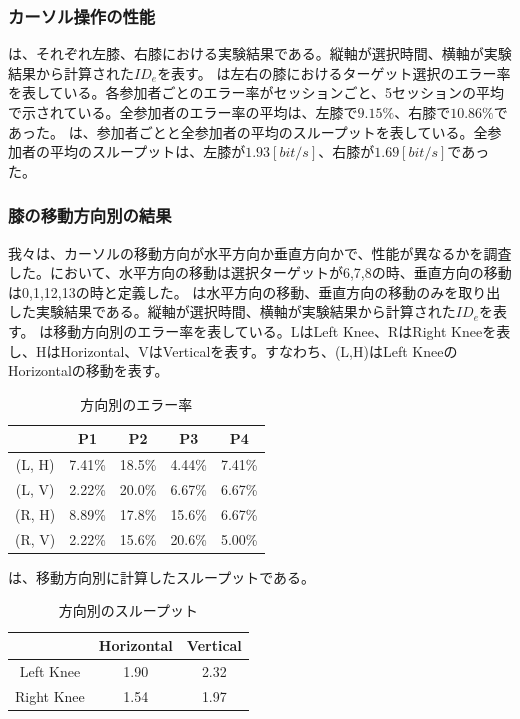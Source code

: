 \documentclass[submit, techrep]{ipsj}
\begin{document}
\subsubsection{カーソル操作の性能}
は、それぞれ左膝、右膝における実験結果である。縦軸が選択時間、横軸が実験結果から計算された$ID_e$を表す。
は左右の膝におけるターゲット選択のエラー率を表している。各参加者ごとのエラー率がセッションごと、5セッションの平均で示されている。全参加者のエラー率の平均は、左膝で$9.15\%$、右膝で$10.86\%$であった。
は、参加者ごとと全参加者の平均のスループットを表している。全参加者の平均のスループットは、左膝が$1.93[bit/s]$、右膝が$1.69[bit/s]$であった。
\subsubsection{膝の移動方向別の結果}
我々は、カーソルの移動方向が水平方向か垂直方向かで、性能が異なるかを調査した。において、水平方向の移動は選択ターゲットが6,7,8の時、垂直方向の移動は0,1,12,13の時と定義した。
は水平方向の移動、垂直方向の移動のみを取り出した実験結果である。縦軸が選択時間、横軸が実験結果から計算された$ID_e$を表す。
は移動方向別のエラー率を表している。LはLeft Knee、RはRight Kneeを表し、HはHorizontal、VはVerticalを表す。すなわち、(L,H)はLeft KneeのHorizontalの移動を表す。
\begin{table}[tb]
	\begin{center}
		\begin{tabular}{|c|c|c|c|c|}
		\hline
				& P1 & P2 & P3 & P4 \\ \hline
		(L, H) & 7.41\% & 18.5\% & 4.44\% & 7.41\% \\ \hline
		(L, V) & 2.22\% & 20.0\% & 6.67\% & 6.67\% \\ \hline
		(R, H) & 8.89\% & 17.8\% & 15.6\% & 6.67\% \\ \hline
		(R, V) & 2.22\% & 15.6\% & 20.6\% & 5.00\% \\ \hline
		\end{tabular}
	\end{center}
	\caption{方向別のエラー率}
	\label{tb:err_direction}
\end{table}
は、移動方向別に計算したスループットである。
\begin{table}[tb]
	\begin{center}
		\begin{tabular}{|c|c|c|}
		\hline
				   & Horizontal & Vertical   \\ \hline
		Left Knee  & 1.90 & 2.32  \\ \hline
		Right Knee & 1.54 & 1.97  \\ \hline
		\end{tabular}
	\end{center}
	\caption{方向別のスループット}
	\label{tb:tp_direction}
\end{table}
\end{document}
